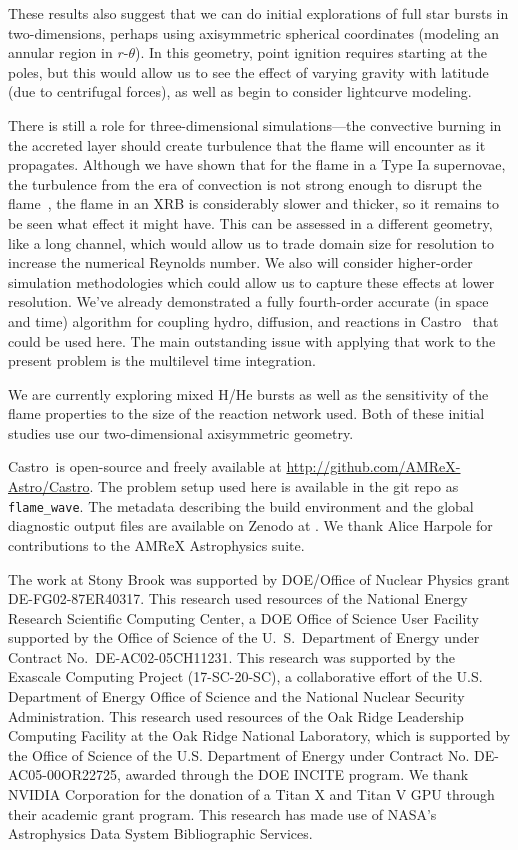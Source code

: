 \documentclass[twocolumn,linenumbers,times,tighten]{aastex631}
\newcommand{\castro}{{\sf Castro}}
\begin{document}
These results also suggest that we can do initial explorations of full
star bursts in two-dimensions, perhaps using axisymmetric spherical
coordinates (modeling an annular region in $r$-$\theta$).  In this
geometry, point ignition requires starting at the poles, but this
would allow us to see the effect of varying gravity with latitude (due
to centrifugal forces), as well as begin to consider lightcurve modeling.

There is still a role for three-dimensional simulations---the
convective burning in the accreted layer should create turbulence that
the flame will encounter as it propagates.  Although we have shown
that for the flame in a Type Ia supernovae, the turbulence from the
era of convection is not strong enough to disrupt the
flame~\citep{wdturb}, the flame in an XRB is considerably slower and
thicker, so it remains to be seen what effect it might have.  This can
be assessed in a different geometry, like a long channel, which would
allow us to trade domain size for resolution to increase the numerical
Reynolds number.  We also will consider higher-order simulation
methodologies which could allow us to capture these effects at lower
resolution.  We've already demonstrated a fully fourth-order accurate
(in space and time) algorithm for coupling hydro, diffusion, and
reactions in \castro~\citep{castro-sdc} that could be used here.  The
main outstanding issue with applying that work to the present problem
is the multilevel time integration.

We are currently exploring mixed H/He bursts as well as the
sensitivity of the flame properties to the size of the reaction
network used.  Both of these initial studies use our two-dimensional
axisymmetric geometry.


\begin{acknowledgements}
\castro\ is open-source and freely available at
\url{http://github.com/AMReX-Astro/Castro}.  The problem setup used
here is available in the git repo as {\tt flame\_wave}. The metadata
describing the build environment and the global diagnostic output
files are available on Zenodo at \citet{xrb_data}.  We thank Alice
Harpole for contributions to the AMReX Astrophysics suite.

The work at Stony Brook was supported by DOE/Office of Nuclear
Physics grant DE-FG02-87ER40317.  This research used resources of the
National Energy Research Scientific Computing Center, a DOE Office of
Science User Facility supported by the Office of Science of the
U.~S.\ Department of Energy under Contract No.\ DE-AC02-05CH11231.
This research was supported by the Exascale Computing Project
(17-SC-20-SC), a collaborative effort of the U.S. Department of Energy
Office of Science and the National Nuclear Security Administration.
This research used resources of the Oak Ridge Leadership Computing
Facility at the Oak Ridge National Laboratory, which is supported by
the Office of Science of the U.S. Department of Energy under Contract
No. DE-AC05-00OR22725, awarded through the DOE INCITE program.  We
thank NVIDIA Corporation for the donation of a Titan X and Titan V GPU
through their academic grant program.  This research has made use of
NASA's Astrophysics Data System Bibliographic Services.
\end{acknowledgements}
\end{document}
